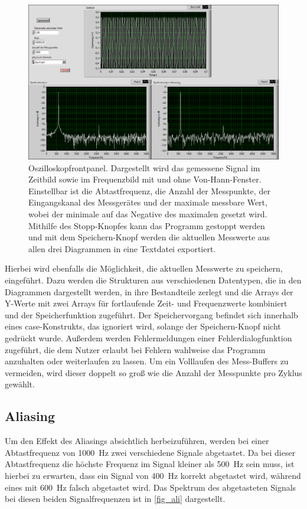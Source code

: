 \documentclass[
a4paper,
12pt,
pagesize,
ngerman
]{scrartcl}
\begin{document}
	\begin{figure}[H]  
		\includegraphics[width=1\textwidth]{EIRE2018Dateien/Tag3/ManuellVIp}
		\centering
		\caption{
			Oszilloskopfrontpanel. Dargestellt wird das gemessene Signal im Zeitbild sowie im Frequenzbild mit und ohne Von-Hann-Fenster. Einstellbar ist die Abtastfrequenz, die Anzahl der Messpunkte, der Eingangskanal des Messgerätes und der maximale messbare Wert, wobei der minimale auf das Negative des maximalen gesetzt wird.
			Mithilfe des Stopp-Knopfes kann das Programm gestoppt werden und mit dem Speichern-Knopf werden die aktuellen Messwerte aus allen drei Diagrammen in eine Textdatei exportiert.
		}
		\label{fig_tag23_oszi_manuell_front}
		\centering
	\end{figure}

	Hierbei wird ebenfalls die Möglichkeit, die aktuellen Messwerte zu speichern, eingeführt.
	Dazu werden die Strukturen aus verschiedenen Datentypen, die in den Diagrammen dargestellt werden, in ihre Bestandteile zerlegt und die Arrays der Y-Werte mit zwei Arrays für fortlaufende Zeit- und Frequenzwerte kombiniert und der Speicherfunktion zugeführt.
	Der Speichervorgang befindet sich innerhalb eines case-Konstrukts, das ignoriert wird, solange der Speichern-Knopf nicht gedrückt wurde.
	Außerdem werden Fehlermeldungen einer Fehlerdialogfunktion zugeführt, die dem Nutzer erlaubt bei Fehlern wahlweise das Programm anzuhalten oder weiterlaufen zu lassen.
	Um ein Volllaufen des Mess-Buffers zu vermeiden, wird dieser doppelt so groß wie die Anzahl der Messpunkte pro Zyklus gewählt.
	
	\subsection{Aliasing}
	Um den Effekt des Aliasings absichtlich herbeizuführen, werden bei einer Abtastfrequenz von \SI{1000}{\hertz} zwei verschiedene Signale abgetastet.
	Da bei dieser Abtastfrequenz die höchste Frequenz im Signal kleiner als \SI{500}{\hertz} sein muss, ist hierbei zu erwarten, dass ein Signal von \SI{400}{\hertz} korrekt abgetastet wird, während eines mit \SI{600}{\hertz} falsch abgetastet wird.
	Das Spektrum des abgetasteten Signals bei diesen beiden Signalfrequenzen ist in \cref{fig_ali} dargestellt.
	
\end{document}
